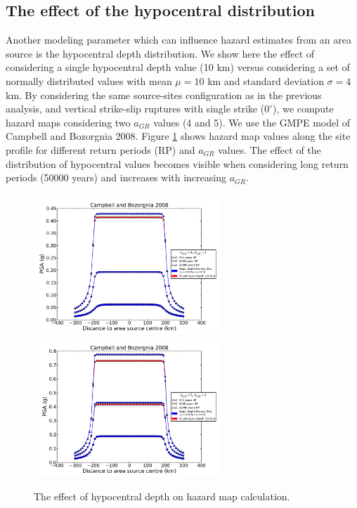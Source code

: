 \subsection{The effect of the hypocentral distribution}
Another modeling parameter which can influence hazard estimates from an area source is the hypocentral
depth distribution. We show here the effect of considering a single hypocentral depth value (10 km) versus
considering a set of normally distributed values with mean $\mu=10$ km and standard deviation $\sigma=4$ km. By considering the same source-sites configuration as in the previous analysis, and vertical
strike-slip ruptures with single strike ($0^{\circ}$), we compute hazard maps considering two $a_{GR}$ values (4 and 5). We use the GMPE model of Campbell and Bozorgnia 2008. Figure \ref{fig:hypo_depth_area} shows hazard map values along the site profile for different
return periods (RP) and $a_{GR}$ values. The effect of the distribution of hypocentral values becomes visible when considering long return periods (50000 years) and increases with increasing $a_{GR}$.
\begin{figure}
\centering
\includegraphics[width=7cm]{./Pictures/PGA_a4_CB2008_hypo_depth.pdf}
\includegraphics[width=7cm]{./Pictures/PGA_a5_CB2008_hypo_depth.pdf}
\caption{The effect of hypocentral depth on hazard map calculation.}
\label{fig:hypo_depth_area}
\end{figure}


